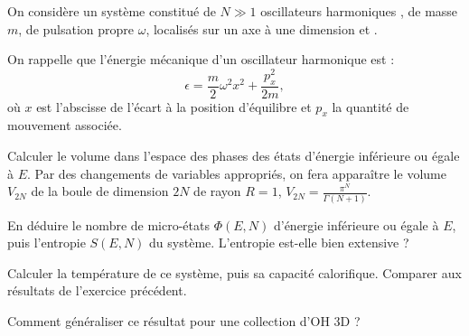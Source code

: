 On considère un système constitué de $N \gg 1$ oscillateurs harmoniques , de masse $m$, de pulsation propre $\omega$, localisés sur un axe à une dimension et .

On rappelle que l'énergie mécanique d'un oscillateur harmonique est :
$$
\epsilon=\frac{m}{2}\omega^2 x^2+\frac{p_x^2}{2m} , \nonumber
$$
où $x$ est l'abscisse de l'écart à la position d'équilibre et $p_x$ la quantité de mouvement associée.

\question
Calculer le volume dans l'espace des phases des états d'énergie inférieure ou égale à $E$. Par des changements de variables appropriés, on fera apparaître le volume $V_{2N}$ de la boule de dimension $2N$ de rayon $R=1$, $V_{2N}=\frac{\pi^N}{\Gamma(N+1)}$.

\question
En déduire le nombre de micro-états $\Phi(E,N)$ d'énergie inférieure ou égale à $E$, puis l'entropie $S(E,N)$ du système. L'entropie est-elle bien extensive ?

\question
Calculer la température de ce système, puis sa capacité calorifique. Comparer aux résultats de l'exercice précédent.

\question
Comment généraliser ce résultat pour une collection d'OH 3D ?
